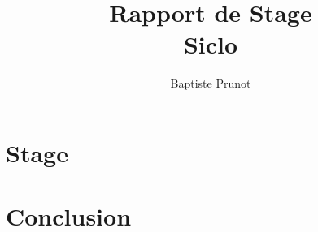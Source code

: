 \documentclass{report}
\author{Baptiste Prunot}
\title{Rapport de Stage\\Siclo}
\begin{document}
    \maketitle
    \tableofcontents
    \pagebreak
    
    
    \part{Stage}
    \part{Conclusion}
\end{document}
